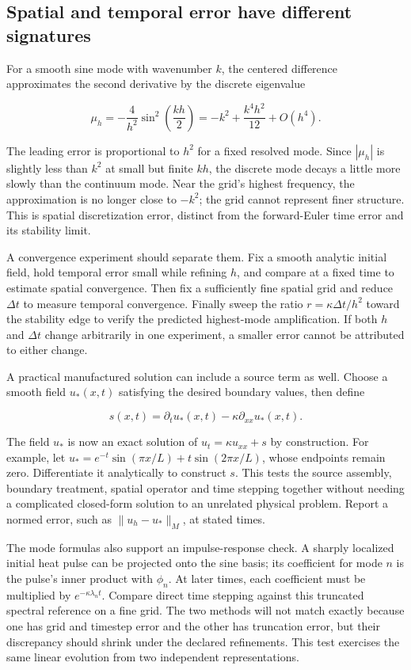 \subsection{Spatial and temporal error have different signatures}\label{04-visual-computing-ii-ch030-spatial-and-temporal-error-have-different-signatures}

For a smooth sine mode with wavenumber \(k\), the centered difference approximates the second derivative by the discrete eigenvalue

\[
\mu_h=-\frac{4}{h^2}\sin^2\left(\frac{kh}{2}\right)
=-k^2+\frac{k^4h^2}{12}+O(h^4).
\]

The leading error is proportional to \(h^2\) for a fixed resolved mode. Since \(|\mu_h|\) is slightly less than \(k^2\) at small but finite \(kh\), the discrete mode decays a little more slowly than the continuum mode. Near the grid's highest frequency, the approximation is no longer close to \(-k^2\); the grid cannot represent finer structure. This is spatial discretization error, distinct from the forward-Euler time error and its stability limit.

A convergence experiment should separate them. Fix a smooth analytic initial field, hold temporal error small while refining \(h\), and compare at a fixed time to estimate spatial convergence. Then fix a sufficiently fine spatial grid and reduce \(\Delta t\) to measure temporal convergence. Finally sweep the ratio \(r=\kappa\Delta t/h^2\) toward the stability edge to verify the predicted highest-mode amplification. If both \(h\) and \(\Delta t\) change arbitrarily in one experiment, a smaller error cannot be attributed to either change.

A practical manufactured solution can include a source term as well. Choose a smooth field \(u_*(x,t)\) satisfying the desired boundary values, then define

\[
s(x,t)=\partial_tu_*(x,t)-\kappa\partial_{xx}u_*(x,t).
\]

The field \(u_*\) is now an exact solution of \(u_t=\kappa u_{xx}+s\) by construction. For example, let \(u_*=e^{-t}\sin(\pi x/L)+t\sin(2\pi x/L)\), whose endpoints remain zero. Differentiate it analytically to construct \(s\). This tests the source assembly, boundary treatment, spatial operator and time stepping together without needing a complicated closed-form solution to an unrelated physical problem. Report a normed error, such as \(\|u_h-u_*\|_M\), at stated times.

The mode formulas also support an impulse-response check. A sharply localized initial heat pulse can be projected onto the sine basis; its coefficient for mode \(n\) is the pulse's inner product with \(\phi_n\). At later times, each coefficient must be multiplied by \(e^{-\kappa\lambda_nt}\). Compare direct time stepping against this truncated spectral reference on a fine grid. The two methods will not match exactly because one has grid and timestep error and the other has truncation error, but their discrepancy should shrink under the declared refinements. This test exercises the same linear evolution from two independent representations.

